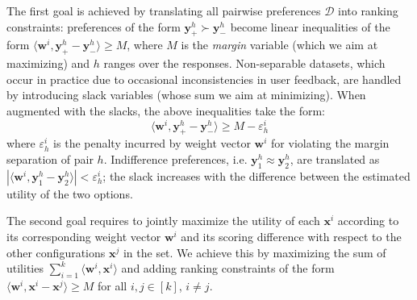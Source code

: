 \documentclass{article}
\renewcommand\[{\begin{equation}}
\renewcommand\]{\end{equation}}
\newcommand{\calvar}[1]{\ensuremath{\mathcal{#1}}}
\newcommand{\calD}{\calvar{D}}
\newcommand{\calX}{\calvar{X}}
\newcommand{\vecvar}[1]{\ensuremath{\boldsymbol{#1}}}
\newcommand{\vw}{\vecvar{w}}
\newcommand{\vx}{\vecvar{x}}
\newcommand{\vy}{\vecvar{y}}
\DeclareMathOperator*{\argmax}{argmax}
\begin{document}
The first goal is achieved by translating all pairwise preferences
$\calD$ into ranking constraints: preferences of the form
$\vy^h_+ \succ \vy^h_-$ become linear inequalities of the form
$\langle \vw^i, \vy^h_+ - \vy^h_- \rangle \geq M$, where $M$ is the
{\em margin} variable (which we aim at maximizing) and $h$ ranges over
the responses.  Non-separable datasets, which occur in practice due to
occasional inconsistencies in user feedback, are handled by
introducing slack variables (whose sum we aim at minimizing). When
augmented with the slacks, the above inequalities take the form:
%
$$ \langle \vw^{i}, \vy^{h}_+ - \vy^{h}_- \rangle \ge M - \varepsilon^{i}_h $$
%
where $\varepsilon^{i}_h$ is the penalty incurred by weight vector $\vw^{i}$
for violating the margin separation of pair $h$. Indifference preferences, i.e.
$\vy^h_1 \approx \vy^h_2$, are translated as $|\langle \vw^i, \vy^h_1 - \vy^h_2 \rangle| < \varepsilon^i_h$;
the slack increases with the difference between the estimated utility of the
two options.

The second goal requires to jointly maximize the utility of each
$\vx^{i}$ according to its corresponding weight vector $\vw^i$ and its
scoring difference with respect to the other configurations $\vx^j$ in
the set. We achieve this by maximizing the sum of utilities
$\sum_{i=1}^k \langle \vw^{i}, \vx^{i} \rangle$ and adding ranking
constraints of the form
$\langle \vw^{i}, \vx^{i} - \vx^{j} \rangle \geq M$ for all
$i,j\in[k]$, $i \ne j$.


\end{document}
